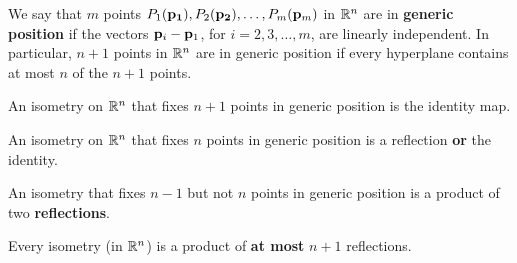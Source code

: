 
\begin{definition} 
    We say that \(m\) points \(P_1(\mathbf{p_1}), P_2(\mathbf{p_2}), \dots, P_m(\mathbf{p}_m)\) in \(\mathbb{R}^n\) are in \textbf{generic position} if the vectors \(\mathbf{p}_i - \mathbf{p}_1\), for \(i = 2, 3, \dots, m\), are linearly independent. In particular, \(n + 1\) points in \(\mathbb{R}^n\) are in generic position if every hyperplane contains at most \(n\) of the \(n + 1\) points.
\end{definition}

\begin{theorem}
    \begin{statements}{}
        \item An isometry on \(\mathbb{R}^n\) that fixes \(n + 1\) points in generic position is the identity map.
        \item An isometry on \(\mathbb{R}^n\) that fixes \(n\) points in generic position is a reflection \textbf{or} the identity.
        \item An isometry that fixes \(n - 1\) but not \(n\) points in generic position is a product of two \textbf{reflections}.
        \item Every isometry (in \(\mathbb{R}^n\)) is a product of \textbf{at most} \(n + 1\) reflections.
    \end{statements}
\end{theorem}

\newpage
